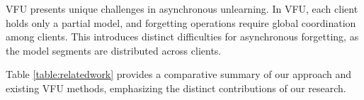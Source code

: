 VFU presents unique challenges in asynchronous unlearning. In VFU, each client holds only a partial model, and forgetting operations require global coordination among clients. This introduces distinct difficulties for asynchronous forgetting, as the model segments are distributed across clients.

Table \ref{table:relatedwork} provides a comparative summary of our approach and existing VFU methods, emphasizing the distinct contributions of our research.

\begin{table}[t]
\centering
\caption{Vertical Federated Unlearning Research Summary}
\label{table:relatedwork}
\end{table}


